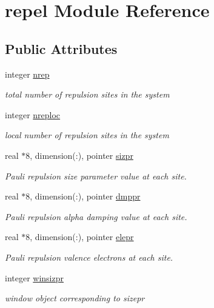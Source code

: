 \hypertarget{classrepel}{\section{repel Module Reference}
\label{classrepel}
}
\subsection*{Public Attributes}
\begin{DoxyCompactItemize}
\item 
integer \hyperlink{classrepel_aa057e660d3345ed00ae95e94c2c15862}{nrep}
\begin{DoxyCompactList}\small\item\em total number of repulsion sites in the system \end{DoxyCompactList}\item 
integer \hyperlink{classrepel_aa09824fa35952602fb305944557af5bc}{nreploc}
\begin{DoxyCompactList}\small\item\em local number of repulsion sites in the system \end{DoxyCompactList}\item 
real $\ast$8, dimension(\-:), pointer \hyperlink{classrepel_aa01d3fe70eb371350165dafe0e560eca}{sizpr}
\begin{DoxyCompactList}\small\item\em Pauli repulsion size parameter value at each site. \end{DoxyCompactList}\item 
real $\ast$8, dimension(\-:), pointer \hyperlink{classrepel_a6e8d98a05daee2d70e0fe648504b23e4}{dmppr}
\begin{DoxyCompactList}\small\item\em Pauli repulsion alpha damping value at each site. \end{DoxyCompactList}\item 
real $\ast$8, dimension(\-:), pointer \hyperlink{classrepel_a42bde0e9432191e215fb58159ea9bee6}{elepr}
\begin{DoxyCompactList}\small\item\em Pauli repulsion valence electrons at each site. \end{DoxyCompactList}\item 
integer \hyperlink{classrepel_a0551b1278d6eef4019f16ceb407b917c}{winsizpr}
\begin{DoxyCompactList}\small\item\em window object corresponding to sizepr \end{DoxyCompactList}\item 

\end{DoxyCompactItemize}
